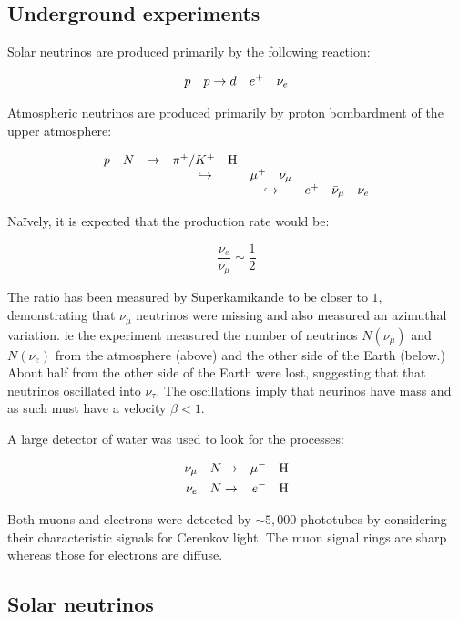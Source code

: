 \subsection{Underground experiments}

Solar neutrinos are produced primarily by the following reaction:

\[
  p \quad p \to d \quad e^+ \quad \nu_e
\]

Atmospheric neutrinos are produced primarily by proton bombardment of the upper atmosphere:

\[
  \begin{array}{ccccc}
  p \quad N & \to & \pi^+/K^+ \quad \textrm{H}      &                 & \\
      &     &  \hookrightarrow & \mu^+ \quad \nu_{\mu} & \\
      &     &                  & \hookrightarrow & e^+ \quad \bar{\nu}_{\mu} \quad \nu_e
  \end{array}
\]

Naïvely, it is expected that the production rate would be:

\[
  \frac{\nu_e}{\nu_{\mu}} \sim \frac{1}{2}
\]

The ratio has been measured by Superkamikande to be closer to $1$, demonstrating that $\nu_{\mu}$ neutrinos were missing and also measured an azimuthal variation.  ie the experiment measured the number of neutrinos $N(\nu_{\mu})$ and $N(\nu_e)$ from the atmosphere (above) and the other side of the Earth (below.)  About half from the other side of the Earth were lost, suggesting that that neutrinos oscillated into $\nu_{\tau}$.  The oscillations imply that neurinos have mass and as such must have a velocity $\beta < 1$.

A large detector of water was used to look for the processes:

\begin{eqnarray*}
  \nu_{\mu} \quad N & \to & \mu^- \quad \textrm{H} \\
  \nu_e     \quad N & \to & e^-  \quad \textrm{H}
\end{eqnarray*}

Both muons and electrons were detected by $\sim 5,000$ phototubes by considering their characteristic signals for Cerenkov light.  The muon signal rings are sharp whereas those for electrons are diffuse.

\subsection{Solar neutrinos}


